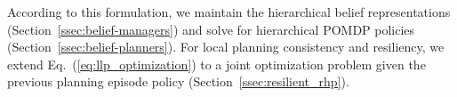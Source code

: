 \documentclass[letterpaper]{article} %
\newcommand{\ph}[1]{{\textbf{#1}:}} %
\newcommand{\phdone}[1]{} %
\newcommand{\argmax}{\mathop{\mathrm{argmax}}}
\begin{document}
\phdone{Section Structure}
According to this formulation, we maintain the hierarchical belief representations (Section~\ref{ssec:belief-managers}) and solve for hierarchical POMDP policies (Section~\ref{ssec:belief-planners}).
For local planning consistency and resiliency, we extend Eq.~(\ref{eq:llp_optimization}) to a joint optimization problem given the previous planning episode policy (Section~\ref{ssec:resilient_rhp}).



\end{document}

